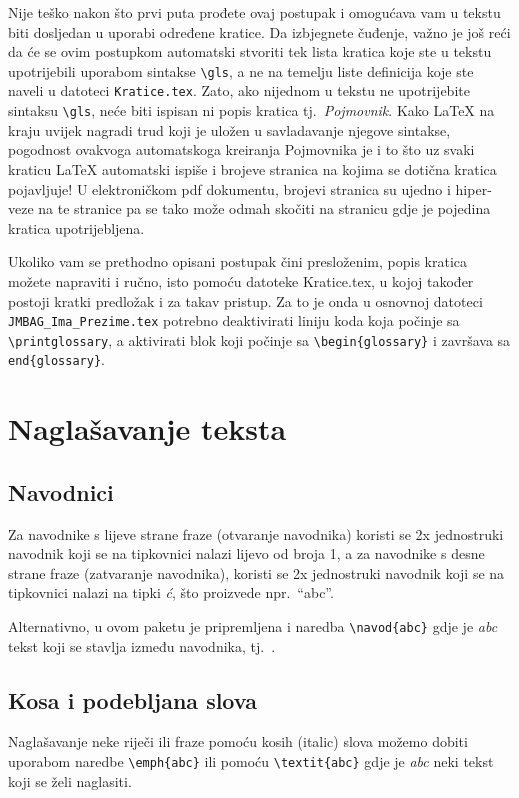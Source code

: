 Nije teško nakon što prvi puta prođete ovaj postupak i omogućava vam u tekstu biti dosljedan u uporabi određene kratice. Da izbjegnete čuđenje, važno je još reći da će se ovim postupkom automatski stvoriti tek lista kratica koje ste u tekstu upotrijebili uporabom sintakse \verb|\gls|, a ne na temelju liste definicija koje ste naveli u datoteci \verb|Kratice.tex|. Zato, ako nijednom u tekstu ne upotrijebite sintaksu \verb|\gls|, neće biti ispisan ni popis kratica tj.\ \emph{Pojmovnik}. {\color{blue} Kako \LaTeX{} na kraju uvijek nagradi trud koji je uložen u savladavanje njegove sintakse, pogodnost ovakvoga automatskoga kreiranja Pojmovnika je i to što uz svaki kraticu \LaTeX{} automatski ispiše i brojeve stranica na kojima se dotična kratica pojavljuje!} U elektroničkom pdf dokumentu, brojevi stranica su ujedno i hiper-veze na te stranice pa se tako može odmah skočiti na stranicu gdje je pojedina kratica upotrijebljena.

Ukoliko vam se prethodno opisani postupak čini presloženim, popis kratica možete napraviti i ručno, isto pomoću datoteke Kratice.tex, u kojoj također postoji kratki predložak i za takav pristup. Za to je onda u osnovnoj datoteci \verb|JMBAG_Ima_Prezime.tex| potrebno deaktivirati liniju koda koja počinje sa \verb|\printglossary|, a aktivirati blok koji počinje sa \verb|\begin{glossary}| i završava sa \verb|end{glossary}|.



\section{Naglašavanje teksta}
\subsection{Navodnici}
Za navodnike s lijeve strane fraze (otvaranje navodnika) koristi se 2x jednostruki navodnik koji se na tipkovnici nalazi lijevo od broja 1, a za navodnike s desne strane fraze (zatvaranje navodnika), koristi se 2x jednostruki navodnik koji se na tipkovnici nalazi na tipki \emph{ć}, što proizvede npr.\ ``abc''.

{\color{blue} Alternativno, u ovom paketu je pripremljena i naredba {\color{red} \verb|\navod{abc}|} gdje je \emph{abc} tekst koji se stavlja između navodnika, tj.\ .}

\subsection{Kosa i podebljana slova}
Naglašavanje neke riječi ili fraze pomoću kosih (italic) slova možemo dobiti uporabom naredbe {\color{red} \verb|\emph{abc}|} ili pomoću  {\color{red}\verb|\textit{abc}|} gdje je \emph{abc} neki tekst koji se želi naglasiti.

